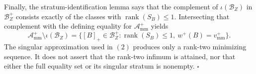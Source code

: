 Finally, the stratum-identification lemma says that the complement of \(\iota(\mathcal B_Z)\) in \(\mathcal B_Z^+\) consists exactly of the classes with \(\operatorname{rank}(S_B)\le1\).  Intersecting that complement with the defining equality for \(\mathcal A_{\mathrm{mm}}^+\) yields
\[
 \mathcal A_{\mathrm{mm}}^+\setminus\iota(\mathcal B_Z)
 =\{[B]_+\in\mathcal B_Z^+:\operatorname{rank}(S_B)\le1,\ w^+(B)=v_{\mathrm{mm}}^+\}.
\]
The singular approximation used in \((2)\) produces only a rank-two minimizing sequence.  It does not assert that the rank-two infimum is attained, nor that either the full equality set or its singular stratum is nonempty. \(\square\)
